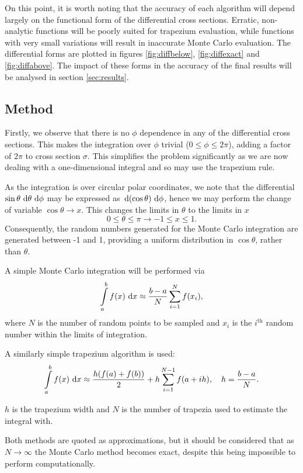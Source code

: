 \documentclass[]{article}
\begin{document}
On this point, it is worth noting that the accuracy of each algorithm will depend largely on the functional form of the differential cross sections. Erratic, non-analytic functions will be poorly suited for trapezium evaluation, while functions with very small variations will result in inaccurate Monte Carlo evaluation. The differential forms are plotted in figures \ref{fig:diffbelow}, \ref{fig:diffexact} and \ref{fig:diffabove}. The impact of these forms in the accuracy of the final results will be analysed in section \ref{sec:results}.

\subsection{Method}\label{ssec:method}

Firstly, we observe that there is no $\phi$ dependence in any of the differential cross sections. This makes the integration over $\phi$ trivial ($0\leq\phi\leq2\pi$), adding a factor of $2\pi$ to cross section $\sigma$. This simplifies the problem significantly as we are now dealing with a one-dimensional integral and so may use the trapezium rule.

As the integration is over circular polar coordinates, we note that the differential $\sin{\theta}\,\operatorname{d}\!{\theta}\,\operatorname{d}\!{\phi}$ may be expressed as $\,\operatorname{d}\!{(\cos{\theta})}\,\operatorname{d}\!{\phi}$, hence we may perform the change of variable $\cos{\theta} \to x$. This changes the limits in $\theta$ to the limits in $x$ $$0 \leq \theta \leq \pi \to -1 \leq x \leq 1.$$ Consequently, the random numbers generated for the Monte Carlo integration are generated between -1 and 1, providing a uniform distribution in $\cos{\theta}$, rather than $\theta$.

A simple Monte Carlo integration will be performed via $$\int\limits_{a}^{b}f(x)\,\operatorname{d}\!{x} \approx \frac{b-a}{N}\sum\limits_{i=1}^{N}f(x_{i}),$$ where $N$ is the number of random points to be sampled and $x_{i}$ is the $i^{\mathrm{th}}$ random number within the limits of integration.

A similarly simple trapezium algorithm is used: $$\int\limits_{a}^{b}f(x)\,\operatorname{d}\!{x} \approx \frac{h(f(a) + f(b))}{2} + h\sum\limits_{i=1}^{N-1}f(a+ih),\quad h=\frac{b-a}{N}.$$

$h$ is the trapezium width and $N$ is the number of trapezia used to estimate the integral with.

Both methods are quoted as approximations, but it should be considered that as $N \to \infty$ the Monte Carlo method becomes exact, despite this being impossible to perform computationally.
\end{document}
